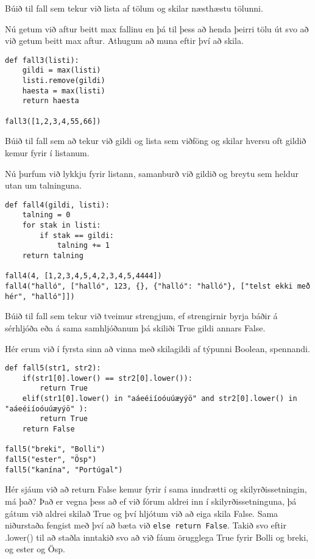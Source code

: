 \begin{exercise}\label{fun3}
Búið til fall sem tekur við lista af tölum og skilar næsthæstu tölunni.
\end{exercise}
\begin{Answer}[ref={fun3}]
Nú getum við aftur beitt max fallinu en þá til þess að henda þeirri tölu út svo að við getum beitt max aftur.
Athugum að muna eftir því að skila.
	\begin{lstlisting}
def fall3(listi):
	gildi = max(listi)
	listi.remove(gildi)
	haesta = max(listi)
	return haesta

fall3([1,2,3,4,55,66])\end{lstlisting}
\end{Answer}

\begin{exercise}\label{fun4}
Búið til fall sem að tekur við gildi og lista sem viðföng og skilar hversu oft gildið kemur fyrir í listanum.
\end{exercise}
\begin{Answer}[ref={fun4}]
Nú þurfum við lykkju fyrir listann, samanburð við gildið og breytu sem heldur utan um talninguna.
	\begin{lstlisting}
def fall4(gildi, listi):
	talning = 0
	for stak in listi:
		if stak == gildi:
			talning += 1
	return talning

fall4(4, [1,2,3,4,5,4,2,3,4,5,4444])
fall4("halló", ["halló", 123, {}, {"halló": "halló"}, ["telst ekki með hér", "halló"]])\end{lstlisting}
\end{Answer}

\begin{exercise}\label{fun5}
Búið til fall sem tekur við tveimur strengjum, ef strengirnir byrja báðir á sérhljóða eða á sama samhljóðanum þá skiliði True gildi annars False.
\end{exercise}
\begin{Answer}[ref={fun5}]
Hér erum við í fyrsta sinn að vinna með skilagildi af týpunni Boolean, spennandi.


	\begin{lstlisting}
def fall5(str1, str2):
	if(str1[0].lower() == str2[0].lower()):
		return True
	elif(str1[0].lower() in "aáeéiíoóuúæyýö" and str2[0].lower() in "aáeéiíoóuúæyýö" ):
		return True
	return False

fall5("breki", "Bolli")
fall5("ester", "Ösp")
fall5("kanína", "Portúgal")
\end{lstlisting}
Hér sjáum við að return False kemur fyrir í sama inndrætti og skilyrðissetningin, má það?
Það er vegna þess að ef við fórum aldrei inn í skilyrðissetninguna, þá gátum við aldrei skilað True og því hljótum við að eiga skila False.
Sama niðurstaða fengist með því að bæta við \texttt{else return False}.
Takið svo eftir .lower() til að staðla inntakið svo að við fáum örugglega True fyrir Bolli og breki, og ester og Ösp.

\end{Answer}

